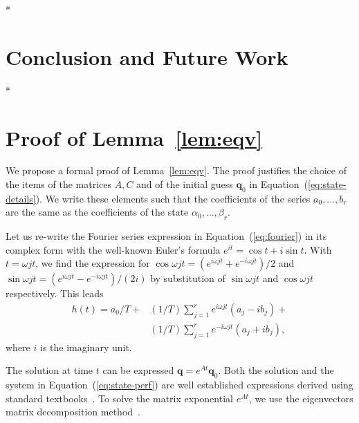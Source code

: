\documentclass[letterpaper,10pt,conference]{ieeeconf}
\theoremstyle{definition}
\begin{document}
*


\section{Conclusion and Future Work}
\label{sec:conclusion}

*


\balance

 

\leavevmode\thispagestyle{empty}\newpage
\nobalance

\appendices

\section{Proof of Lemma~\ref{lem:eqv}}
\label{app:proof-eqv}

We propose a formal proof of Lemma~\ref{lem:eqv}. The proof justifies the choice of the items of the matrices $A,C$ and of the initial guess $\mathbf{q}_0$ in Equation~(\ref{eq:state-details}). We write these elements such that the coefficients of the series $a_0,\dots,b_r$ are the same as the coefficients of the state $\alpha_0,\dots,\beta_r$.

Let us re-write the Fourier series expression in Equation~(\ref{eq:fourier}) in its complex form with the well-known Euler's formula $e^{it}=\cos{t}+i\sin{t}$. With $t=\omega jt$, we find the expression for $\cos{\omega jt}=(e^{i\omega jt}+e^{-i\omega jt})/2$ and $\sin{\omega jt}=(e^{i\omega jt}-e^{-i\omega jt})/(2i)$ by substitution of $\sin{\omega jt}$ and $\cos{\omega jt}$ respectively. This leads~\cite{kuo1967automatic}
\begin{equation}\begin{split}\label{eq:proof-complex}
  h(t)=a_0/T+&(1/T)\sum_{j=1}^{r}{e^{i\omega jt}(a_j-ib_j)}+\\&(1/T)\sum_{j=1}^{r}{e^{-i\omega jt}(a_j+ib_j)},
 \end{split}\end{equation}
where $i$ is the imaginary unit. 

The solution at time $t$ can be expressed $\mathbf{q}=e^{At}\mathbf{q}_0$. Both the solution and the system in Equation~(\ref{eq:state-perf}) are well established expressions derived using standard textbooks~\cite{kuo1967automatic, ogata2002modern}. To solve the matrix exponential $e^{At}$, we use the eigenvectors matrix decomposition method~\cite{moler2003nineteen}.
\end{document}
